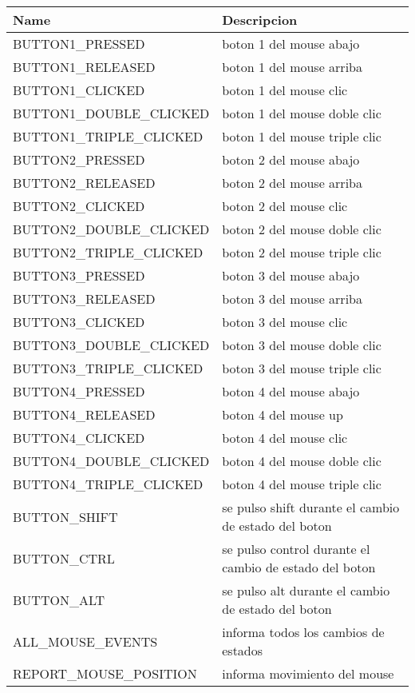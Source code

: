 \documentclass{article}
\begin{document}
\begin{table}[htbp]
  \begin{center}
    \begin{tabular}{|l|l|}
      \hline
      Name & Descripcion \\
      \hline \hline
      BUTTON1\_PRESSED & boton 1 del mouse abajo \\ \hline
      BUTTON1\_RELEASED & boton 1 del mouse arriba \\ \hline
      BUTTON1\_CLICKED & boton 1 del mouse clic \\ \hline
      BUTTON1\_DOUBLE\_CLICKED &  boton 1 del mouse doble clic \\ \hline
      BUTTON1\_TRIPLE\_CLICKED &  boton 1 del mouse triple clic \\ \hline
      BUTTON2\_PRESSED & boton 2 del mouse abajo \\ \hline
      BUTTON2\_RELEASED &  boton 2 del mouse arriba \\ \hline
      BUTTON2\_CLICKED & boton 2 del mouse clic \\ \hline
      BUTTON2\_DOUBLE\_CLICKED &  boton 2 del mouse doble clic \\ \hline
      BUTTON2\_TRIPLE\_CLICKED &  boton 2 del mouse triple clic \\ \hline
      BUTTON3\_PRESSED & boton 3 del mouse abajo \\ \hline
      BUTTON3\_RELEASED &  boton 3 del mouse arriba \\ \hline
      BUTTON3\_CLICKED & boton 3 del mouse clic \\ \hline
      BUTTON3\_DOUBLE\_CLICKED &  boton 3 del mouse doble clic \\ \hline
      BUTTON3\_TRIPLE\_CLICKED &  boton 3 del mouse triple clic \\ \hline
      BUTTON4\_PRESSED & boton 4 del mouse abajo \\ \hline
      BUTTON4\_RELEASED &  boton 4 del mouse up \\ \hline
      BUTTON4\_CLICKED & boton 4 del mouse clic \\ \hline
      BUTTON4\_DOUBLE\_CLICKED &  boton 4 del mouse doble clic \\ \hline
      BUTTON4\_TRIPLE\_CLICKED &  boton 4 del mouse triple clic \\ \hline
      BUTTON\_SHIFT &  se pulso shift durante el cambio de estado del boton \\ \hline
      BUTTON\_CTRL & se pulso control durante el cambio de estado del boton \\ \hline
      BUTTON\_ALT &  se pulso alt durante el cambio de estado del boton \\ \hline
      ALL\_MOUSE\_EVENTS &  informa todos los cambios de estados \\ \hline
      REPORT\_MOUSE\_POSITION & informa movimiento del mouse \\ \hline
    \end{tabular}
  \end{center}
\end{table}
\end{document}
